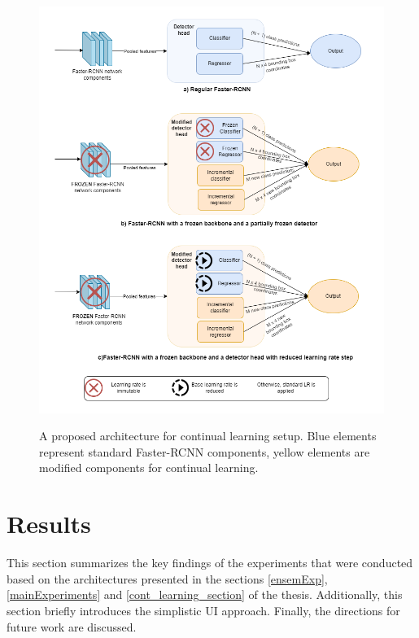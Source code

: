\documentclass[english, 12pt, a4paper, elec, utf8, a-1b, online]{aaltothesis}
\begin{document}
\begin{figure}[htb]
	\begin{center}
		\includegraphics[width=16cm]{./FC.png}
	\end{center}
	\caption{A proposed architecture for continual learning setup. Blue elements represent standard Faster-RCNN components, yellow elements are modified components for continual learning.}
	\begin{center}
		\label{continualModel}
	\end{center}
\end{figure}
\FloatBarrier


\clearpage

\section{Results} 
\label{results} 
This section summarizes the key findings of the experiments that were conducted based on the architectures presented in the sections \ref{ensemExp},  \ref{mainExperiments} and \ref{cont_learning_section} of the thesis. Additionally, this section briefly introduces the simplistic UI approach. Finally, the directions for future work are discussed. 
\end{document}
